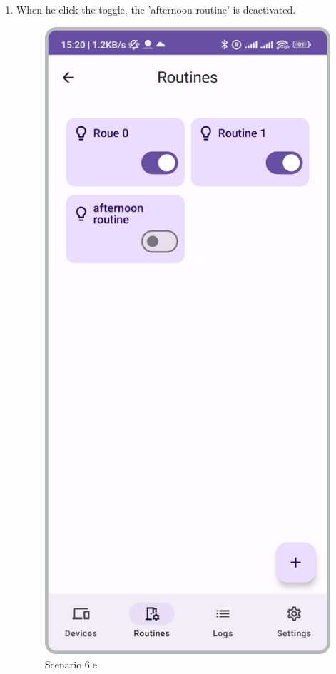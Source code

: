 \begin{enumerate}
\begin{enumerate}
              \item When he click the toggle, the 'afternoon routine' is deactivated.\\
                    \begin{figure}
                        \centering
                        \includegraphics[width=0.5\linewidth]{imgs/usercase/scenario6-c.png}
                        \caption{Scenario 6.e}
                        \label{fig:enter-label}
                    \end{figure}
          \end{enumerate}
\end{enumerate}